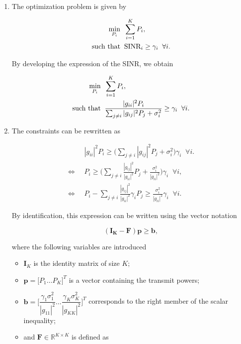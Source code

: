 \documentclass [a4paper, 11pt] {article}
\begin{document}
    \begin{solution}
     \begin{enumerate}
    \item The optimization problem is given by 
    
    \begin{align}
    \min_{P_i} \; \; & \sum_{i=1}^{K} P_i,  \\
    \text{\normalfont such that} \; \;&  \text{\normalfont SINR}_i \geq \gamma_i \; \; \forall i.
    \end{align}
    
    By developing the expression of the SINR, we obtain
    
    \begin{align}
    \min_{P_i} \; \; & \sum_{i=1}^{K} P_i , \\
    \text{\normalfont such that} \; \;&  \frac{|g_{ii}|^2P_i}{ \sum_{j\neq i} |g_{ij}|^2P_j + \sigma_i^2} \geq \gamma_i \; \; \forall i.
    \end{align}
    
    \item The constraints can be rewritten as 
    
    \begin{align}
        & |g_{ii}|^2P_i \geq \Big(\sum_{j\neq i} |g_{ij}|^2P_j + \sigma_i^2\Big) \gamma_i \; \; \forall i.\\
        \Leftrightarrow \; \; &  P_i \geq \Bigg(\sum_{j\neq i} \frac{|g_{ij}|^2}{|g_{ii}|^2}P_j + \frac{\sigma_i^2}{|g_{ii}|^2}\Bigg) \gamma_i \; \; \forall i,\\
        \Leftrightarrow \; \; &  P_i - \sum_{j\neq i} \frac{|g_{ij}|^2}{|g_{ii}|^2} \gamma_i P_j \geq \frac{\sigma_i^2}{|g_{ii}|^2} \gamma_i \; \; \forall i.
    \end{align}
    
    By identification, this expression can be written using the vector notation 
    
    \begin{equation}
    (\mathbf{I_K} - \mathbf{F})\mathbf{p} \geq \mathbf{b},
    \end{equation}
    
    where the following variables are introduced
    
    \begin{itemize}
        \item $\mathbf{I}_K$ is the identity matrix of size $K$;
        \item $\mathbf{p} = \big[P_1 \hdots P_K\big]^T$ is a vector containing the transmit powers;
        \item $\mathbf{b} =  \Bigg[\dfrac{\gamma_1\sigma_1^2}{|g_{11}|^2} \hdots \dfrac{\gamma_K\sigma_K^2}{|g_{KK}|^2}\Bigg]^T$ corresponds to the right member of the scalar inequality;
        \item and $\mathbf{F} \in \mathbb{R}^{K \times K}$ is defined as 
        

\end{itemize}
\end{enumerate}
\end{solution}
\end{document}
